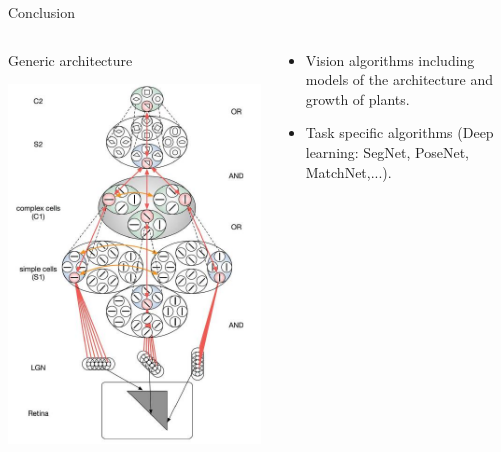 \documentclass[notes,xcolor={x11names,dvipsnames,svgnames},compress]{beamer}
\renewcommand{\(}{\begin{columns}}
\renewcommand{\)}{\end{columns}}
\newcommand{\<}[1]{\begin{column}{#1}}
\renewcommand{\>}{\end{column}}
\begin{document}
\begin{frame}{Conclusion}

\begin{columns}
\begin{column}{0.5\textwidth}
Generic architecture

\includegraphics[width=\linewidth]{pics/hier}
\end{column}
\begin{column}{0.45\textwidth}

\begin{itemize}
\item Vision algorithms including models of the architecture and growth of plants.
\item Task specific algorithms (Deep learning: SegNet, PoseNet, MatchNet,...).
\end{itemize}

\end{column}
\end{columns}

\end{frame}
\end{document}
